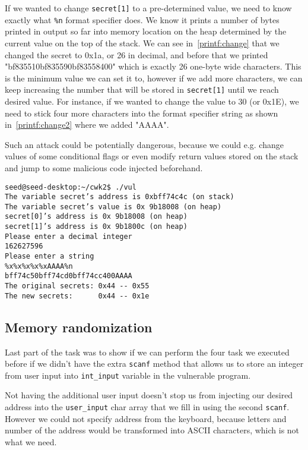 \documentclass[12pt, a4paper, pdflatex]{article}
\begin{document}
If we wanted to change \texttt{secret[1]} to a pre-determined value, we need to know exactly what \texttt{\%n} format specifier does. We know it prints a number of bytes printed in output so far into memory location on the heap determined by the current value on the top of the stack. We can see in~\ref{printf:change} that we changed the secret to 0x1a, or 26 in decimal, and before that we printed "bf835510bf835590bf83558400" which is exactly 26 one-byte wide characters. This is the minimum value we can set it to, however if we add more characters, we can keep increasing the number that will be stored in \texttt{secret[1]} until we reach desired value. For instance, if we wanted to change the value to 30 (or 0x1E), we need to stick four more characters into the format specifier string as shown in~\ref{printf:change2} where we added "AAAA".

Such an attack could be potentially dangerous, because we could e.g. change values of some conditional flags or even modify return values stored on the stack and jump to some malicious code injected beforehand.

\vspace{1em}
\lstset{
	captionpos=b,
	frame=single,
	language=BASH,
	caption=Example of overwriting memory with a specified value,
	label=printf:change2,
	breaklines=true,
  float=tb
}
\begin{lstlisting}
seed@seed-desktop:~/cwk2$ ./vul
The variable secret’s address is 0xbff74c4c (on stack)
The variable secret’s value is 0x 9b18008 (on heap)
secret[0]’s address is 0x 9b18008 (on heap)
secret[1]’s address is 0x 9b1800c (on heap)
Please enter a decimal integer
162627596
Please enter a string
%x%x%x%x%xAAAA%n
bff74c50bff74cd0bff74cc400AAAA
The original secrets: 0x44 -- 0x55
The new secrets:      0x44 -- 0x1e
\end{lstlisting}

\subsection{Memory randomization}

Last part of the task was to show if we can perform the four task we executed before if we didn't have the extra \texttt{scanf} method that allows us to store an integer from user input into \texttt{int\_input} variable in the vulnerable program.

Not having the additional user input doesn't stop us from injecting our desired address into the \texttt{user\_input} char array that we fill in using the second \texttt{scanf}. However we could not specify address from the keyboard, because letters and number of the address would be transformed into ASCII characters, which is not what we need.
\end{document}
